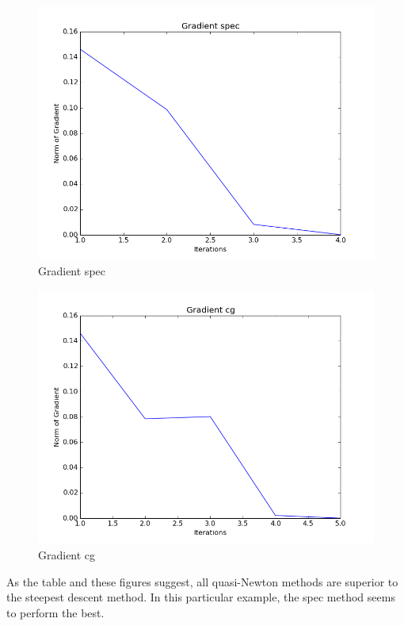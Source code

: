 \documentclass{article}
\begin{document}
\begin{figure}[H]
  \centering
  \includegraphics[scale=0.5]{3spec.png}
  \caption{Gradient spec}
\end{figure}
\begin{figure}[H]
  \centering
  \includegraphics[scale=0.5]{3cg.png}
  \caption{Gradient cg}
\end{figure}
As the table and these figures suggest, all quasi-Newton methods are superior to the steepest descent method. In this particular example, the spec method seems to perform the best.
\end{document}
